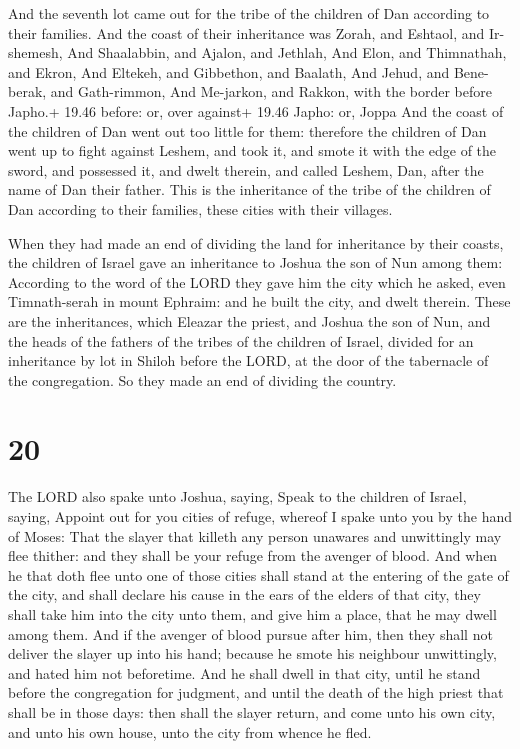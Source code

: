  And the seventh lot came out for the tribe of the
children of Dan according to their families.  And the coast
of their inheritance was Zorah, and Eshtaol, and Ir-shemesh,
 And Shaalabbin, and Ajalon, and Jethlah,  And
Elon, and Thimnathah, and Ekron,  And Eltekeh, and
Gibbethon, and Baalath,  And Jehud, and Bene-berak, and
Gath-rimmon,  And Me-jarkon, and Rakkon, with the border
before Japho.+ 19.46 before: or, over against+ 19.46 Japho: or, Joppa
 And the coast of the children of Dan went out too little
for them: therefore the children of Dan went up to fight against Leshem,
and took it, and smote it with the edge of the sword, and possessed it,
and dwelt therein, and called Leshem, Dan, after the name of Dan their
father.  This is the inheritance of the tribe of the
children of Dan according to their families, these cities with their
villages.

 When they had made an end of dividing the land for
inheritance by their coasts, the children of Israel gave an inheritance
to Joshua the son of Nun among them:  According to the word
of the LORD they gave him the city which he asked, even Timnath-serah in
mount Ephraim: and he built the city, and dwelt therein. 
These are the inheritances, which Eleazar the priest, and Joshua the son
of Nun, and the heads of the fathers of the tribes of the children of
Israel, divided for an inheritance by lot in Shiloh before the LORD, at
the door of the tabernacle of the congregation. So they made an end of
dividing the country.

\hypertarget{section-19}{%
\section{20}\label{section-19}}

 The LORD also spake unto Joshua, saying,  Speak
to the children of Israel, saying, Appoint out for you cities of refuge,
whereof I spake unto you by the hand of Moses:  That the
slayer that killeth any person unawares and unwittingly may flee
thither: and they shall be your refuge from the avenger of blood.
 And when he that doth flee unto one of those cities shall
stand at the entering of the gate of the city, and shall declare his
cause in the ears of the elders of that city, they shall take him into
the city unto them, and give him a place, that he may dwell among them.
 And if the avenger of blood pursue after him, then they
shall not deliver the slayer up into his hand; because he smote his
neighbour unwittingly, and hated him not beforetime.  And he
shall dwell in that city, until he stand before the congregation for
judgment, and until the death of the high priest that shall be in those
days: then shall the slayer return, and come unto his own city, and unto
his own house, unto the city from whence he fled.

